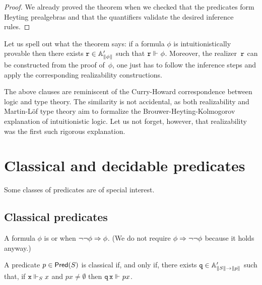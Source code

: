 \begin{proof}
  We already proved the theorem when we checked that the predicates form Heyting prealgebras and that the quantifiers validate the desired inference rules.
\end{proof}
 
Let us spell out what the theorem says: if a formula $\phi$ is intuitionistically
provable then there exists $\R{r} \in \subAtyp{\T{\phi}}$ such that $\R{r} \rz \phi$.
Moreover, the realizer~$\R{r}$ can be constructed from the proof of~$\phi$, one just has
to follow the inference steps and apply the corresponding realizability constructions.

The above clauses are reminiscent of the Curry-Howard correspondence between logic and type theory. The similarity is not accidental, as both realizability and Martin-Löf type theory aim to formalize the Brouwer-Heyting-Kolmogorov explanation of intuitionistic logic. Let us not forget, however, that realizability was the first such rigorous explanation.


\section{Classical and decidable predicates}
\label{sec:special-predicates}

Some classes of predicates are of special interest.

\subsection[\texorpdfstring{$\neg\neg$-stable predicates}{Not-not-stable predicates}]{Classical predicates}
\label{sec:stable-predicates}

A formula $\phi$ is  or  when $\lnot\lnot \phi \lthen \phi$. (We do not require $\phi \lthen \lnot\lnot \phi$ because it holds anyway.)

\begin{proposition}
  \label{prop:when-stable}
  A predicate $p \in \Pred{S}$ is classical if, and only if, there exists $\R{q} \in \subAtyp{\T{S} \to \T{p}}$ such that, if $\R{x} \rz[S] x$ and  $p x \neq \emptyset$ then $\R{q}\,\R{x} \rz p x$.
\end{proposition}

